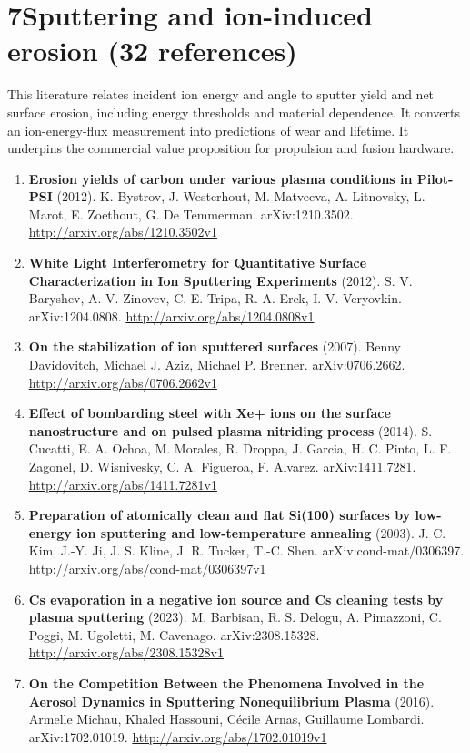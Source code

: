 \documentclass[11pt,a4paper]{article}
\begin{document}
\section*{7\quad Sputtering and ion-induced erosion \textnormal{(\normalsize 32 references)}}
This literature relates incident ion energy and angle to sputter yield and net surface erosion, including energy thresholds and material dependence. It converts an ion-energy-flux measurement into predictions of wear and lifetime. It underpins the commercial value proposition for propulsion and fusion hardware.
\begin{enumerate}[leftmargin=1.4em]
\item \textbf{Erosion yields of carbon under various plasma conditions in Pilot-PSI} (2012). K. Bystrov, J. Westerhout, M. Matveeva, A. Litnovsky, L. Marot, E. Zoethout, G. De Temmerman. arXiv:1210.3502. \url{http://arxiv.org/abs/1210.3502v1}
\item \textbf{White Light Interferometry for Quantitative Surface Characterization in Ion Sputtering Experiments} (2012). S. V. Baryshev, A. V. Zinovev, C. E. Tripa, R. A. Erck, I. V. Veryovkin. arXiv:1204.0808. \url{http://arxiv.org/abs/1204.0808v1}
\item \textbf{On the stabilization of ion sputtered surfaces} (2007). Benny Davidovitch, Michael J. Aziz, Michael P. Brenner. arXiv:0706.2662. \url{http://arxiv.org/abs/0706.2662v1}
\item \textbf{Effect of bombarding steel with Xe+ ions on the surface nanostructure and on pulsed plasma nitriding process} (2014). S. Cucatti, E. A. Ochoa, M. Morales, R. Droppa, J. Garcia, H. C. Pinto, L. F. Zagonel, D. Wisnivesky, C. A. Figueroa, F. Alvarez. arXiv:1411.7281. \url{http://arxiv.org/abs/1411.7281v1}
\item \textbf{Preparation of atomically clean and flat Si(100) surfaces by low-energy ion sputtering and low-temperature annealing} (2003). J. C. Kim, J.-Y. Ji, J. S. Kline, J. R. Tucker, T.-C. Shen. arXiv:cond-mat/0306397. \url{http://arxiv.org/abs/cond-mat/0306397v1}
\item \textbf{Cs evaporation in a negative ion source and Cs cleaning tests by plasma sputtering} (2023). M. Barbisan, R. S. Delogu, A. Pimazzoni, C. Poggi, M. Ugoletti, M. Cavenago. arXiv:2308.15328. \url{http://arxiv.org/abs/2308.15328v1}
\item \textbf{On the Competition Between the Phenomena Involved in the Aerosol Dynamics in Sputtering Nonequilibrium Plasma} (2016). Armelle Michau, Khaled Hassouni, Cécile Arnas, Guillaume Lombardi. arXiv:1702.01019. \url{http://arxiv.org/abs/1702.01019v1}

\end{enumerate}
\end{document}
